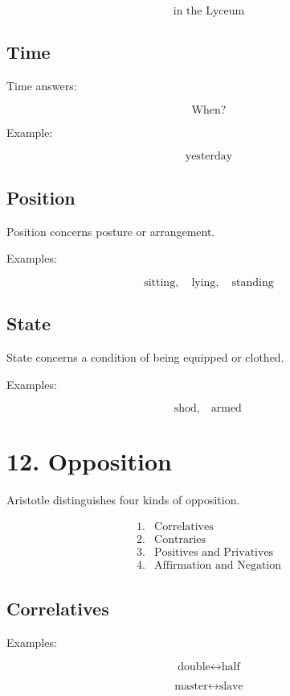 \documentclass[12pt]{article}
\begin{document}
\[
\text{in the Lyceum}
\]

\subsection*{Time}

Time answers:

\[
\text{When?}
\]

Example:

\[
\text{yesterday}
\]

\subsection*{Position}

Position concerns posture or arrangement.

Examples:

\[
\text{sitting}, \quad \text{lying}, \quad \text{standing}
\]

\subsection*{State}

State concerns a condition of being equipped or clothed.

Examples:

\[
\text{shod}, \quad \text{armed}
\]

\section*{12. Opposition}

Aristotle distinguishes four kinds of opposition.

\[
\begin{array}{ll}
1. & \text{Correlatives} \\
2. & \text{Contraries} \\
3. & \text{Positives and Privatives} \\
4. & \text{Affirmation and Negation}
\end{array}
\]

\subsection*{Correlatives}

Examples:

\[
\text{double} \leftrightarrow \text{half}
\]

\[
\text{master} \leftrightarrow \text{slave}
\]
\end{document}
